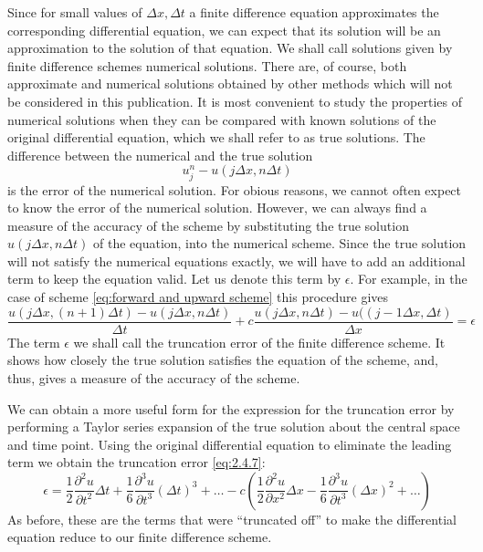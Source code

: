 Since for small values of $\Delta x, \Delta t$ a finite difference equation approximates the corresponding differential equation, we can expect that its solution will be an approximation to the solution of that equation. We shall call solutions given by finite difference schemes numerical solutions. There are, of course, both approximate and numerical solutions obtained by other methods which will not be considered in this publication. It is most convenient to study the properties of numerical solutions when they can be compared with known solutions of the original differential equation, which we shall refer to as true solutions. The difference between the numerical and the true solution
 \begin{equation}
     u_j^n-u(j\Delta x,n\Delta t)
 \end{equation}
 is the error of the numerical solution. For obious reasons, we cannot often expect to know the error of the numerical solution. However, we can always find a measure of the accuracy of the scheme by substituting the true solution $u(j\Delta x, n\Delta t)$ of the equation, into the numerical scheme. Since the true solution will not satisfy the numerical equations exactly, we will have to add an additional term to keep the equation valid. Let us denote this term by $\epsilon$. For example, in the case of scheme \ref{eq:forward and upward scheme} this procedure gives
 \begin{equation}\label{eq:2.4.7}
     \frac{u(j\Delta x,(n+1)\Delta t)-u(j\Delta x, n\Delta t)}{\Delta t}+c\frac{u(j\Delta x, n\Delta t)-u((j-1\Delta x, \Delta t)}{\Delta x}=\epsilon
 \end{equation}
The term $\epsilon$ we shall call the truncation error of the finite difference scheme. It shows how closely the true solution satisfies the equation of the scheme, and, thus, gives a measure of the accuracy of the scheme.

We can obtain a more useful form for the expression for the truncation error by performing a Taylor series expansion of the true solution about the central space and time point. Using the original differential equation to eliminate the leading term we obtain the truncation error \ref{eq:2.4.7}:
\begin{equation}\label{eq: 2.4.8}
    \epsilon=\frac{1}{2}\frac{\partial^2u}{\partial t^2}\Delta t+\frac{1}{6}\frac{\partial^3u}{\partial t^3}(\Delta t)^3+\dots-c\left(\frac{1}{2}\frac{\partial^2u}{\partial x^2}\Delta x-\frac{1}{6}\frac{\partial^3u}{\partial t^3}(\Delta x)^2+\dots\right)
\end{equation}
As before, these are the terms that were “truncated off” to make the differential equation reduce to our finite difference scheme.

